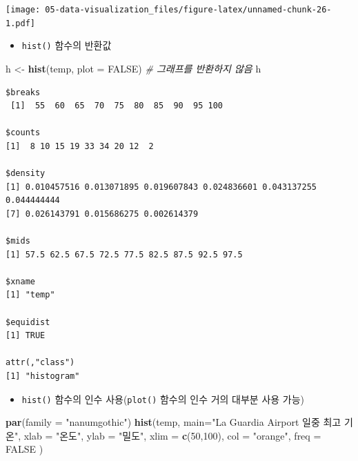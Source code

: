 \documentclass[
  11pt,
]{krantz}
\newenvironment{Shaded}{\begin{snugshade}}{\end{snugshade}}
\newcommand{\CommentTok}[1]{\textcolor[rgb]{0.37,0.37,0.37}{\textit{#1}}}
\newcommand{\DataTypeTok}[1]{\textcolor[rgb]{0.27,0.27,0.27}{#1}}
\newcommand{\DecValTok}[1]{\textcolor[rgb]{0.06,0.06,0.06}{#1}}
\newcommand{\KeywordTok}[1]{\textcolor[rgb]{0.27,0.27,0.27}{\textbf{#1}}}
\newcommand{\NormalTok}[1]{#1}
\newcommand{\OperatorTok}[1]{\textcolor[rgb]{0.43,0.43,0.43}{\textbf{#1}}}
\newcommand{\OtherTok}[1]{\textcolor[rgb]{0.37,0.37,0.37}{#1}}
\newcommand{\StringTok}[1]{\textcolor[rgb]{0.5,0.5,0.5}{#1}}
\providecommand{\tightlist}{%
  \setlength{\itemsep}{0pt}\setlength{\parskip}{0pt}}
\begin{document}
\begin{Shaded}
\end{Shaded}

\texttt{[image: 05-data-visualization\_files/figure-latex/unnamed-chunk-26-1.pdf]}

\normalsize

\begin{itemize}
\tightlist
\item
  \texttt{hist()} 함수의 반환값
\end{itemize}

\footnotesize

\begin{Shaded}
\begin{Highlighting}[]
\NormalTok{h <-}\StringTok{ }\KeywordTok{hist}\NormalTok{(temp, }\DataTypeTok{plot =} \OtherTok{FALSE}\NormalTok{) }\CommentTok{# 그래프를 반환하지 않음}
\NormalTok{h}
\end{Highlighting}
\end{Shaded}

\begin{verbatim}
$breaks
 [1]  55  60  65  70  75  80  85  90  95 100

$counts
[1]  8 10 15 19 33 34 20 12  2

$density
[1] 0.010457516 0.013071895 0.019607843 0.024836601 0.043137255 0.044444444
[7] 0.026143791 0.015686275 0.002614379

$mids
[1] 57.5 62.5 67.5 72.5 77.5 82.5 87.5 92.5 97.5

$xname
[1] "temp"

$equidist
[1] TRUE

attr(,"class")
[1] "histogram"
\end{verbatim}

\normalsize

\begin{itemize}
\tightlist
\item
  \texttt{hist()} 함수의 인수 사용(\texttt{plot()} 함수의 인수 거의 대부분 사용 가능)
\end{itemize}

\footnotesize

\begin{Shaded}
\begin{Highlighting}[]
\KeywordTok{par}\NormalTok{(}\DataTypeTok{family =} \StringTok{"nanumgothic"}\NormalTok{)}
\KeywordTok{hist}\NormalTok{(temp,}
\DataTypeTok{main=}\StringTok{"La Guardia Airport 일중 최고 기온"}\NormalTok{,}
\DataTypeTok{xlab =} \StringTok{"온도"}\NormalTok{,}
\DataTypeTok{ylab =} \StringTok{"밀도"}\NormalTok{,}
\DataTypeTok{xlim =} \KeywordTok{c}\NormalTok{(}\DecValTok{50}\NormalTok{,}\DecValTok{100}\NormalTok{),}
\DataTypeTok{col =} \StringTok{"orange"}\NormalTok{,}
\DataTypeTok{freq =} \OtherTok{FALSE}
\NormalTok{)}
\end{Highlighting}
\end{Shaded}
\end{document}
